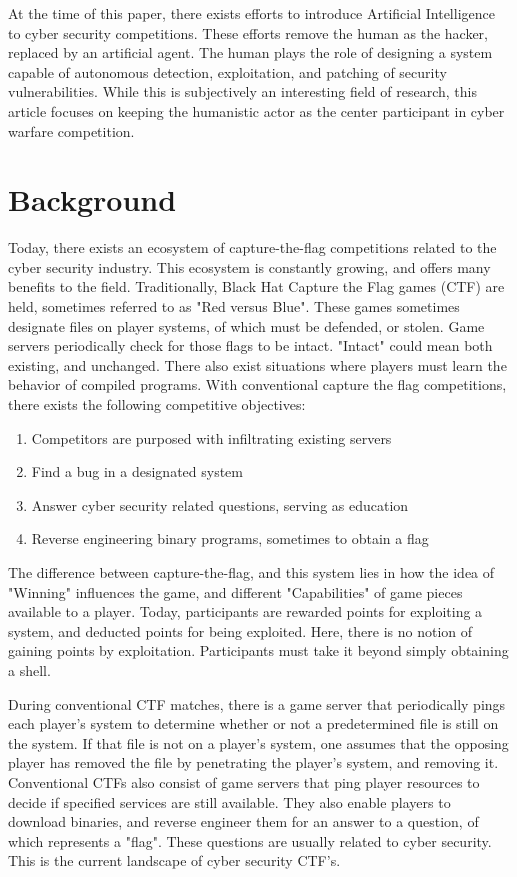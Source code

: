 \documentclass[10pt, titlepage, twocolumn]{article}
\begin{document}
At the time of this paper, there exists efforts to introduce Artificial Intelligence to cyber security competitions. These efforts remove the human as the hacker, replaced by an artificial agent. The human plays the role of designing a system capable of autonomous detection, exploitation, and patching of security vulnerabilities. While this is subjectively an interesting field of research, this article focuses on keeping the humanistic actor as the center participant in cyber warfare competition.  

\section{Background}

Today, there exists an ecosystem of capture-the-flag competitions related to the cyber security industry. This ecosystem is constantly growing, and offers many benefits to the field. Traditionally, Black Hat Capture the Flag games (CTF) are held, sometimes referred to as "Red versus Blue". These games sometimes designate files on player systems, of which must be defended, or stolen. Game servers periodically check for those flags to be intact. "Intact" could mean both existing, and unchanged. There also exist situations where players must learn the behavior of compiled programs. With conventional capture the flag competitions, there exists the following competitive objectives:

\begin{enumerate}
	\item Competitors are purposed with infiltrating existing servers
	\item Find a bug in a designated system
	\item Answer cyber security related questions, serving as education
	\item Reverse engineering binary programs, sometimes to obtain a flag
\end{enumerate}

The difference between capture-the-flag, and this system lies in how the idea of "Winning" influences the game, and different "Capabilities" of game pieces available to a player. Today, participants are rewarded points for exploiting a system, and deducted points for being exploited. Here, there is no notion of gaining points by exploitation. Participants must take it beyond simply obtaining a shell. 

During conventional CTF matches, there is a game server that periodically pings each player's system to determine whether or not a predetermined file is still on the system. If that file is not on a player's system, one assumes that the opposing player has removed the file by penetrating the player's system, and removing it. Conventional CTFs also consist of game servers that ping player resources to decide if specified services are still available. They also enable players to download binaries, and reverse engineer them for an answer to a question, of which represents a "flag".  These questions are usually related to cyber security. This is the current landscape of cyber security CTF's.
\end{document}
